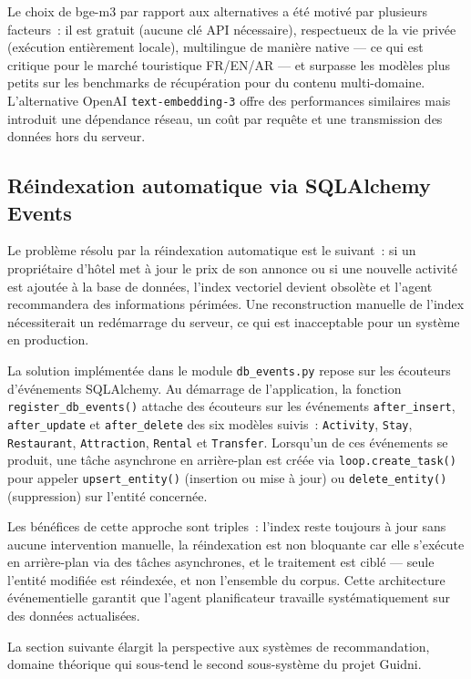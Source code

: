 Le choix de bge-m3 par rapport aux alternatives a été motivé par plusieurs facteurs~: il est
gratuit (aucune clé API nécessaire), respectueux de la vie privée (exécution entièrement locale),
multilingue de manière native --- ce qui est critique pour le marché touristique FR/EN/AR --- et
surpasse les modèles plus petits sur les benchmarks de récupération pour du contenu multi-domaine.
L'alternative OpenAI \texttt{text-embedding-3} offre des performances similaires mais introduit
une dépendance réseau, un coût par requête et une transmission des données hors du serveur.


\subsection{Réindexation automatique via SQLAlchemy Events}

Le problème résolu par la réindexation automatique est le suivant~: si un propriétaire d'hôtel
met à jour le prix de son annonce ou si une nouvelle activité est ajoutée à la base de données,
l'index vectoriel devient obsolète et l'agent recommandera des informations périmées. Une
reconstruction manuelle de l'index nécessiterait un redémarrage du serveur, ce qui est
inacceptable pour un système en production.

La solution implémentée dans le module \texttt{db\_events.py} repose sur les écouteurs
d'événements SQLAlchemy. Au démarrage de l'application, la fonction \texttt{register\_db\_events()}
attache des écouteurs sur les événements \texttt{after\_insert}, \texttt{after\_update} et
\texttt{after\_delete} des six modèles suivis~: \texttt{Activity}, \texttt{Stay},
\texttt{Restaurant}, \texttt{Attraction}, \texttt{Rental} et \texttt{Transfer}. Lorsqu'un de
ces événements se produit, une tâche asynchrone en arrière-plan est créée via
\texttt{loop.create\_task()} pour appeler \texttt{upsert\_entity()} (insertion ou mise à jour)
ou \texttt{delete\_entity()} (suppression) sur l'entité concernée.

Les bénéfices de cette approche sont triples~: l'index reste toujours à jour sans aucune
intervention manuelle, la réindexation est non bloquante car elle s'exécute en arrière-plan
via des tâches asynchrones, et le traitement est ciblé --- seule l'entité modifiée est
réindexée, et non l'ensemble du corpus. Cette architecture événementielle garantit que l'agent
planificateur travaille systématiquement sur des données actualisées.

La section suivante élargit la perspective aux systèmes de recommandation, domaine théorique
qui sous-tend le second sous-système du projet Guidni.

